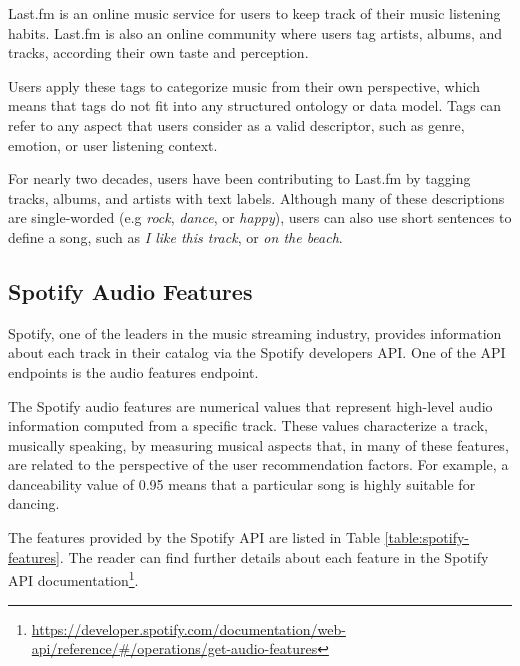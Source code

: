 \documentclass[sn-mathphys]{sn-jnl}%
\theoremstyle{thmstyleone}%
\theoremstyle{thmstyletwo}%
\theoremstyle{thmstylethree}%
\begin{document}
Last.fm is an online music service for users to keep track of their music listening habits.
Last.fm is also an online community where users tag artists, albums, and tracks, according their own taste and perception.

Users apply these tags to
categorize music from their own perspective, which
means that tags do not fit into any structured ontology
or data model.
Tags can refer to any aspect that users consider as a valid descriptor, such as genre,
emotion, or user listening context.

For nearly two decades, users have been contributing to Last.fm by tagging tracks, albums, and artists with text labels.
Although many of these descriptions are single-worded (e.g \emph{rock}, \emph{dance}, or \emph{happy}),
users can also use short sentences to define a song, such as \emph{I like this track}, or \emph{on the beach}.

\subsection{Spotify Audio Features}

Spotify, one of the leaders in the music streaming industry, provides information about each track in their catalog via the Spotify developers API.
One of the API endpoints is the audio features endpoint.

The Spotify audio features are numerical values that represent high-level audio information computed from a specific
track. These values characterize a track, musically speaking,
by measuring musical aspects that, in many of these features, are related to the perspective of the user recommendation factors.
For example, a danceability value of 0.95 means
that a particular song is highly suitable for dancing.

The features provided by the Spotify API are listed in
Table \ref{table:spotify-features}.
The reader can find further details about each feature in the Spotify API documentation\footnote[5]{
      \url{https://developer.spotify.com/documentation/web-api/reference/\#/operations/get-audio-features}
}.
\end{document}
